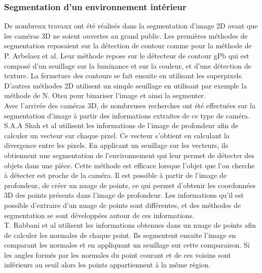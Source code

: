 \subsubsection{Segmentation d'un environnement intérieur}
De nombreux travaux ont été réalisés dans la segmentation d'image 2D avant que les caméras 3D ne soient
ouvertes au grand public. Les premières méthodes de segmentation reposaient sur la détection de contour
comme pour la méthode de P. Arbelaez et al\cite{2DSegmentation1}. Leur méthode repose sur le détecteur
de contour gPb qui est composé d'un seuillage sur la luminance et sur la couleur, et d'une détection
de texture. La fermeture des contours se fait ensuite en utilisant les superpixels. D'autres méthodes
2D utilisent un simple seuillage en utilisant par exemple la méthode de N. Otsu\cite{Otsu} pour binariser
l'image et ainsi la segmenter.\\

Avec l'arrivée des caméras 3D, de nombreuses recherches ont été effectuées sur la segmentation d'image à partir
des informations extraites de ce type de caméra. S.A.A Shah et al\cite{3DSegmentation1} utilisent les informations
de l'image de profondeur afin de calculer un vecteur sur chaque pixel. Ce vecteur s'obtient en calculant la divergence 
entre les pixels. En applicant un seuillage sur les vecteurs, ils obtiennent une segmentation de l'environnement 
qui leur permet de détecter des objets dans une pièce. Cette méthode est efficace lorsque l'objet que l'on 
cherche à détecter est proche de la caméra. Il est possible à partir de l'image de profondeur, de créer un 
nuage de points, ce qui permet d'obtenir les coordonnées 3D des points présents dans l'image de profondeur. Les informations 
qu'il est possible d'extraire d'un nuage de points sont différentes, et des méthodes de segmentation se sont développées autour de ces informations.\\

T. Rabbani et al\cite{pointCloudSegmentation} utilisent les informations obtenues dans un nuage de points afin 
de calculer les normales de chaque point. Ils segmentent ensuite l'image en comparant les normales et en appliquant
un seuillage sur cette comparaison. Si les angles formés par les normales du point courant et de ces voisins sont inférieurs au seuil alors
les points appartiennent à la même région.\\
 
